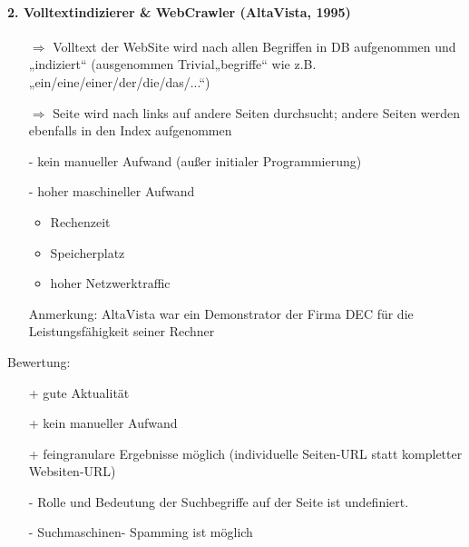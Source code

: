 \paragraph{2. Volltextindizierer \& WebCrawler (AltaVista, 1995)}\hspace*{1mm}
\begin{itemize}
\item[$\Rightarrow$] Volltext der WebSite wird nach allen Begriffen in DB aufgenommen und „indiziert“ (ausgenommen Trivial„begriffe“ wie z.B. „ein/eine/einer/der/die/das/...“)
\item[$\Rightarrow$] Seite wird nach links auf andere Seiten durchsucht; andere Seiten werden ebenfalls in den Index aufgenommen
\item[-] kein manueller Aufwand (außer initialer Programmierung)
\item[-] hoher maschineller Aufwand
  \begin{itemize}
  \item Rechenzeit
  \item Speicherplatz
  \item hoher Netzwerktraffic
  \end{itemize}
\item[Anmerkung:] AltaVista war ein Demonstrator der Firma DEC für die Leistungsfähigkeit seiner Rechner
\end{itemize}
Bewertung:
\begin{itemize}
\item[+] gute Aktualität
\item[+] kein manueller Aufwand
\item[+] feingranulare Ergebnisse möglich (individuelle Seiten-URL statt kompletter Websiten-URL)
\item[-] Rolle und Bedeutung der Suchbegriffe auf der Seite ist undefiniert.
\item[-] Suchmaschinen- Spamming ist möglich
\end{itemize}


